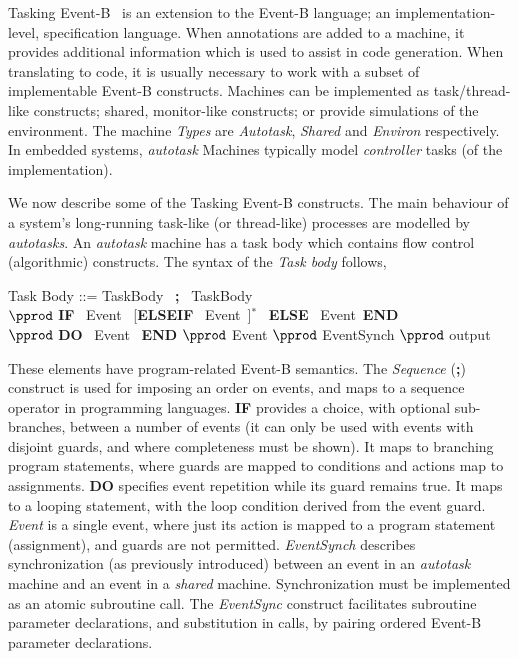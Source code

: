 \documentclass{llncs}%
\begin{document}
Tasking Event-B~\cite{ae2011a} is an extension to the Event-B language; an implementation-level, specification language. When annotations are added to a machine, it provides additional information which is used to assist in code generation. When translating to code, it is usually necessary to work with a subset of implementable Event-B constructs.  Machines can be implemented as task/thread-like constructs; shared, monitor-like constructs; or provide simulations of the environment.  The machine \emph{Types} are \emph{Autotask}, \emph{Shared} and \emph{Environ} respectively.  In embedded systems, \emph{autotask} Machines typically model \emph{controller} tasks (of the implementation). 

We now describe some of the Tasking Event-B constructs. The main behaviour of a system's  long-running task-like (or thread-like) processes are modelled by \emph{autotasks}. An \emph{autotask} machine has a task body which contains flow control (algorithmic) constructs. The syntax of the \emph{Task body} follows,
%
%
\begin{center}
\begin{minipage}{0.8\textwidth}
Task Body ::= TaskBody~ \textbf{;}~ TaskBody\\
\hspace*{1cm}$\pprod$ \textbf{IF}~ Event~ [\textbf{ELSEIF}~ Event~]$^*$~ \textbf{ELSE}~ Event~\textbf{END} \\
\hspace*{1cm}$\pprod$ \textbf{DO}~ Event~ \textbf{END} $\pprod$ Event $\pprod$ EventSynch $\pprod$ output 
\end{minipage}
\end{center}
%
\noindent These elements have program-related Event-B semantics. The \emph{Sequence} (\textbf{;}) construct is used for imposing an order on events, and maps to a sequence operator in programming languages. \textbf{IF} provides a choice, with optional sub-branches, between a number of events (it can only be used with events with disjoint guards, and where completeness must be shown). It maps to branching program statements, where guards are mapped to conditions and actions map to assignments. \textbf{DO} specifies event repetition while its guard remains true. It maps to a looping statement, with the loop condition derived from the event guard. \emph{Event} is a single event, where just its action is mapped to a program statement (assignment), and guards are not permitted. \emph{EventSynch} describes synchronization (as previously introduced) between an event in an \emph{autotask} machine and an event in a \emph{shared} machine. Synchronization must be implemented as an atomic subroutine call. The \emph{EventSync} construct facilitates subroutine parameter declarations, and substitution in calls, by pairing ordered Event-B parameter declarations. 
\end{document}
